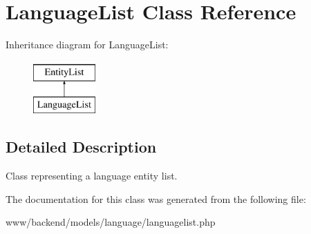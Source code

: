 \hypertarget{classLanguageList}{
\section{LanguageList Class Reference}
\label{classLanguageList}
}
Inheritance diagram for LanguageList:\begin{figure}[H]
\begin{center}
\leavevmode
\includegraphics[height=2.000000cm]{classLanguageList}
\end{center}
\end{figure}


\subsection{Detailed Description}
Class representing a language entity list. 

The documentation for this class was generated from the following file:\begin{DoxyCompactItemize}
\item 
www/backend/models/language/languagelist.php\end{DoxyCompactItemize}
